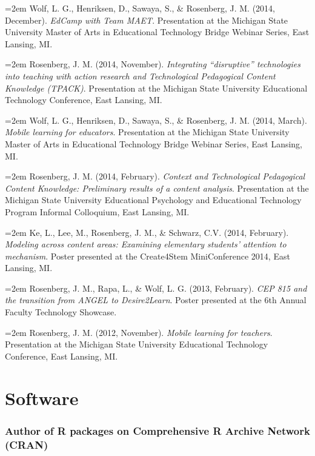 \documentclass[
  14,
]{article}
\begin{document}
\hangindent=2em Wolf, L. G., Henriksen, D., Sawaya, S., \& Rosenberg, J.
M. (2014, December). \emph{EdCamp with Team MAET}. Presentation at the
Michigan State University Master of Arts in Educational Technology
Bridge Webinar Series, East Lansing, MI.

\hangindent=2em Rosenberg, J. M. (2014, November). \emph{Integrating
``disruptive'' technologies into teaching with action research and
Technological Pedagogical Content Knowledge (TPACK)}. Presentation at
the Michigan State University Educational Technology Conference, East
Lansing, MI.

\hangindent=2em Wolf, L. G., Henriksen, D., Sawaya, S., \& Rosenberg, J.
M. (2014, March). \emph{Mobile learning for educators}. Presentation at
the Michigan State University Master of Arts in Educational Technology
Bridge Webinar Series, East Lansing, MI.

\hangindent=2em Rosenberg, J. M. (2014, February). \emph{Context and
Technological Pedagogical Content Knowledge: Preliminary results of a
content analysis}. Presentation at the Michigan State University
Educational Psychology and Educational Technology Program Informal
Colloquium, East Lansing, MI.

\hangindent=2em Ke, L., Lee, M., Rosenberg, J. M., \& Schwarz, C.V.
(2014, February). \emph{Modeling across content areas: Examining
elementary students' attention to mechanism}. Poster presented at the
Create4Stem MiniConference 2014, East Lansing, MI.

\hangindent=2em Rosenberg, J. M., Rapa, L., \& Wolf, L. G. (2013,
February). \emph{CEP 815 and the transition from ANGEL to Desire2Learn}.
Poster presented at the 6th Annual Faculty Technology Showcase.

\hangindent=2em Rosenberg, J. M. (2012, November). \emph{Mobile learning
for teachers}. Presentation at the Michigan State University Educational
Technology Conference, East Lansing, MI.

\hypertarget{software}{%
\section{Software}\label{software}}

\hypertarget{author-of-r-packages-on-comprehensive-r-archive-network-cran}{%
\subsubsection{Author of R packages on Comprehensive R Archive Network
(CRAN)}\label{author-of-r-packages-on-comprehensive-r-archive-network-cran}}
\end{document}
